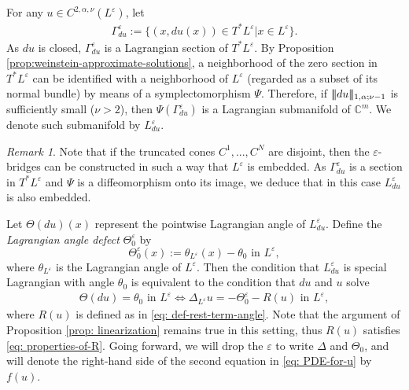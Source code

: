 \documentclass[11pt]{amsart}
\DeclarePairedDelimiter{\tnorm}{\vert\!\vert\!\vert}{\vert\!\vert\!\vert}
\theoremstyle{definition}
\theoremstyle{remark}
\newtheorem{remark}{Remark}
\begin{document}
For any $u \in C^{2,\alpha,\nu}(L^\varepsilon)$, let
\begin{align*}
    \Gamma^\varepsilon_{du}:=\{(x,du(x))\in T^\ast L^\varepsilon\vert x\in L^\varepsilon\}. 
\end{align*}
As $du$ is closed, $\Gamma^\varepsilon_{du}$ is a Lagrangian section of $T^\ast L^\varepsilon$. By Proposition \ref{prop:weinstein-approximate-solutions}, a neighborhood of the zero section in $T^\ast L^\varepsilon$ can be identified with a neighborhood of $L^\varepsilon$ (regarded as a subset of its normal bundle) by means of a symplectomorphism $\Psi$. Therefore, if $\tnorm{du}_{1, \alpha;\nu-1}$ is sufficiently small ($\nu > 2$), then $\Psi(\Gamma^\varepsilon_{du})$ is a Lagrangian submanifold of $\mathbb{C}^m$. We denote such submanifold by $L^\varepsilon_{du}$.
\begin{remark}\label{rmk: embeddedness}
    Note that if the truncated cones $C^1,...,C^N$ are disjoint, then the $\varepsilon$-bridges can be constructed in such a way that $L^\varepsilon$ is embedded. As $\Gamma^\varepsilon_{du}$ is a section in $T^\ast L^\varepsilon$ and $\Psi$ is a diffeomorphism onto its image, we deduce that in this case $L^\varepsilon_{du}$ is also embedded.
\end{remark}
Let $\Theta(du)(x)$ represent the pointwise Lagrangian angle of $L_{du}^\varepsilon$. Define the \emph{Lagrangian angle defect} $\Theta_0^\varepsilon$ by
\begin{equation}
    \Theta_0^\varepsilon(x) := \theta_{L^\varepsilon}(x) - \theta_0 \text{ in } L^\varepsilon,
\end{equation}
where $\theta_{L^\varepsilon}$ is the Lagrangian angle of $L^\varepsilon$. Then the condition that $L_{du}^\varepsilon$ is special Lagrangian with angle $\theta_0$ is equivalent to the condition that $du$ and $u$ solve
\begin{align}\label{eq: PDE-for-u}
    \Theta(du) = \theta_0 \text{ in }L^\varepsilon \Leftrightarrow \Delta_{L^\varepsilon}u=-\Theta_{0}^\varepsilon-R(u) \text{ in } L^\varepsilon,
\end{align}
where $R(u)$ is defined as in \eqref{eq: def-rest-term-angle}. Note that the argument of Proposition \ref{prop: linearization} remains true in this setting, thus $R(u)$ satisfies \eqref{eq: properties-of-R}.
Going forward, we will drop the $\varepsilon$ to write $\Delta$ and $\Theta_0$, and will denote the right-hand side of the second equation in \eqref{eq: PDE-for-u} by $f(u)$.
\end{document}

